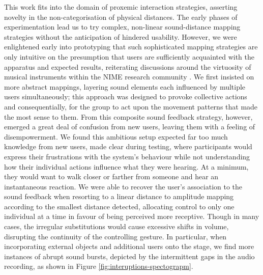 This work fits into the domain of proxemic interaction strategies, asserting novelty in the non-categorisation of physical distances. The early phases of experimentation lead us to try complex, non-linear sound-distance mapping strategies without the anticipation of hindered usability. However, we were enlightened early into prototyping that such sophisticated mapping strategies are only intuitive on the presumption that users are sufficiently acquainted with the apparatus and expected results, reiterating discussions around the virtuosity of musical instruments within the NIME research community \citep{wu_supporting_2017}. We first insisted on more abstract mappings, layering sound elements each influenced by multiple users simultaneously; this approach was designed to provoke collective actions and consequentially, for the group to act upon the movement patterns that made the most sense to them. From this composite sound feedback strategy, however, emerged a great deal of confusion from new users, leaving them with a feeling of disempowerment. We found this ambitious setup expected far too much knowledge from new users, made clear during testing, where participants would express their frustrations with the system's behaviour while not understanding how their individual actions influence what they were hearing. At a minimum, they would want to walk closer or farther from someone and hear an instantaneous reaction. We were able to recover the user's association to the sound feedback when resorting to a linear distance to amplitude mapping according to the smallest distance detected, allocating control to only one individual at a time in favour of being perceived more receptive. Though in many cases, the irregular substitutions would cause excessive shifts in volume, disrupting the continuity of the controlling gesture. In particular, when incorporating external objects and additional users onto the stage, we find more instances of abrupt sound bursts, depicted by the intermittent gaps in the audio recording, as shown in Figure \ref{fig:interuptions-spectograpm}. 

